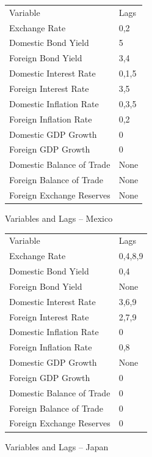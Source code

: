 \documentclass{sig-alternate-05-2015}
\begin{document}
\begin{figure}
\centering
\caption{Variables and Lags -- Mexico}
\begin{tabular}{l l}
Variable 					& Lags  \\
Exchange Rate 				& 0,2		\\
Domestic Bond Yield			& 5		\\
Foreign Bond Yield			& 3,4	\\
Domestic Interest Rate		& 0,1,5	\\
Foreign Interest Rate		& 3,5	\\
Domestic Inflation Rate		& 0,3,5	\\
Foreign Inflation Rate		& 0,2		\\
Domestic GDP Growth			& 0		\\
Foreign GDP Growth			& 0		\\
Domestic Balance of Trade	& None	\\
Foreign Balance of Trade		& None	\\
Foreign Exchange Reserves	& None		\\
\end{tabular}
\label{tab:mexico_vars}
\end{figure}



\begin{figure}
\centering
\caption{Variables and Lags -- Japan}
\begin{tabular}{l l}
Variable 					& Lags  \\
Exchange Rate 				& 0,4,8,9		\\
Domestic Bond Yield			& 0,4	\\
Foreign Bond Yield			& None	\\
Domestic Interest Rate		& 3,6,9	\\
Foreign Interest Rate		& 2,7,9	\\
Domestic Inflation Rate		& 0	\\
Foreign Inflation Rate		& 0,8	\\
Domestic GDP Growth			& None	\\
Foreign GDP Growth			& 0		\\
Domestic Balance of Trade	& 0	\\
Foreign Balance of Trade		& 0	\\
Foreign Exchange Reserves	& 0	\\
\end{tabular}
\label{tab:japan_vars}
\end{figure}
\end{document}

